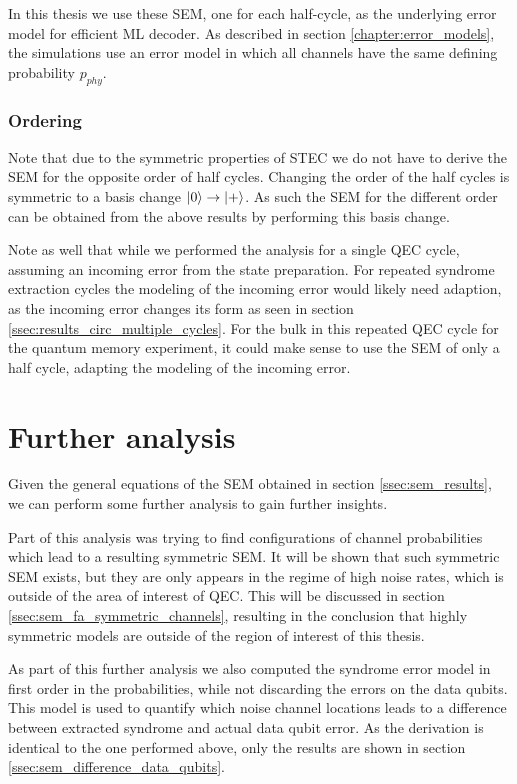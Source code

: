 In this thesis we use these SEM, one for each half-cycle, as the underlying error model for efficient ML decoder. 
As described in section \ref{chapter:error_models}, the simulations use an error model in which all channels have the same defining probability $p_{phy}$.


\subsubsection{Ordering}\label{ssec:sem_order}

Note that due to the symmetric properties of STEC we do not have to derive the SEM for the opposite order of half cycles.
Changing the order of the half cycles is symmetric to a basis change $\ket{0}\rightarrow \ket{+}$. 
As such the SEM for the different order can be obtained from the above results by performing this basis change. 

Note as well that while we performed the analysis for a single QEC cycle, assuming an incoming error from the state preparation.
For repeated syndrome extraction cycles the modeling of the incoming error would likely need adaption, as the incoming error changes its form as seen in section \ref{ssec:results_circ_multiple_cycles}. 
For the bulk in this repeated QEC cycle for the quantum memory experiment, it could make sense to use the SEM of only a half cycle, adapting the modeling of the incoming error. 


\section{Further analysis}

Given the general equations of the SEM obtained in section \ref{ssec:sem_results}, 
we can perform some further analysis to gain further insights.

Part of this analysis was trying to find configurations of channel probabilities which lead to a resulting symmetric SEM.
It will be shown that such symmetric SEM exists, but they are only appears in the regime of high noise rates, which is outside of the area of interest of QEC. 
This will be discussed in section \ref{ssec:sem_fa_symmetric_channels}, 
resulting in the conclusion that highly symmetric models are outside of the region of interest of this thesis. 

As part of this further analysis we also computed the syndrome error model in first order in the probabilities, while not discarding the errors on the data qubits. 
This model is used to quantify which noise channel locations leads to a difference between extracted syndrome and actual data qubit error. 
As the derivation is identical to the one performed above, only the results are shown in section \ref{ssec:sem_difference_data_qubits}.


